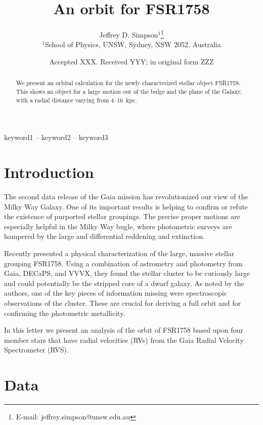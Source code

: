 \documentclass[fleqn,usenatbib,letters]{mnras}
\title[An orbit for FSR1758]{An orbit for FSR1758}
\author[Simpson et al.]{
Jeffrey D. Simpson$^{1}$\thanks{E-mail: jeffrey.simpson@unsw.edu.au}
\\
$^{1}$School of Physics, UNSW, Sydney, NSW 2052, Australia
}
\date{Accepted XXX. Received YYY; in original form ZZZ}
\begin{document}
\label{firstpage}
\pagerange{\pageref{firstpage}--\pageref{lastpage}}
\maketitle

\begin{abstract}
We present an orbital calculation for the newly characterized stellar object FSR1758. This shows an object for a large motion out of the bulge and the plane of the Galaxy, with a radial distance varying from 4--16~kpc.
\end{abstract}

\begin{keywords}
keyword1 -- keyword2 -- keyword3
\end{keywords}



\section{Introduction} \label{sec:intro}
The second data release of the Gaia mission \citep{GaiaCollaboration:2018io} has revolutionized our view of the Milky Way Galaxy. One of its important results is helping to confirm or refute \citep{Kos:2018we} the existence of purported stellar groupings. The precise proper motions are especially helpful in the Milky Way bugle, where photometric surveys are hampered by the large and differential reddening and extinction.

Recently \citet{Barba2018} presented a physical characterization of the large, massive stellar grouping FSR1758. Using a combination of astrometry and photometry from Gaia, DECaPS, and VVVX, they found the stellar cluster to be curiously large and could potentially be the stripped core of a dwarf galaxy. As noted by the authors, one of the key pieces of information missing were spectroscopic observations of the cluster. These are crucial for deriving a full orbit and for confirming the photometric metallicity.

In this letter we present an analysis of the orbit of FSR1758 based upon four member stars that have radial velocities (RVs) from the Gaia Radial Velocity Spectrometer (RVS).

\section{Data}
\end{document}
